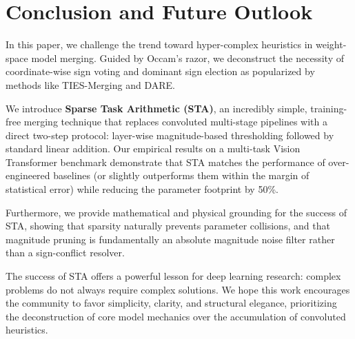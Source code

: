 \section{Conclusion and Future Outlook}
\label{sec:conclusion}

In this paper, we challenge the trend toward hyper-complex heuristics in weight-space model merging. Guided by Occam's razor, we deconstruct the necessity of coordinate-wise sign voting and dominant sign election as popularized by methods like TIES-Merging and DARE. 

We introduce \textbf{Sparse Task Arithmetic (STA)}, an incredibly simple, training-free merging technique that replaces convoluted multi-stage pipelines with a direct two-step protocol: layer-wise magnitude-based thresholding followed by standard linear addition. Our empirical results on a multi-task Vision Transformer benchmark demonstrate that STA matches the performance of over-engineered baselines (or slightly outperforms them within the margin of statistical error) while reducing the parameter footprint by 50\%. 

Furthermore, we provide mathematical and physical grounding for the success of STA, showing that sparsity naturally prevents parameter collisions, and that magnitude pruning is fundamentally an absolute magnitude noise filter rather than a sign-conflict resolver.

The success of STA offers a powerful lesson for deep learning research: complex problems do not always require complex solutions. We hope this work encourages the community to favor simplicity, clarity, and structural elegance, prioritizing the deconstruction of core model mechanics over the accumulation of convoluted heuristics.

